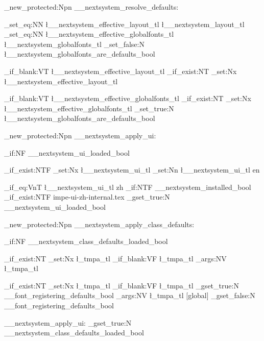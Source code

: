 \cs_new_protected:Npn \__nextsystem_resolve_defaults:
  {
    \tl_set_eq:NN \l__nextsystem_effective_layout_tl \l__nextsystem_layout_tl
    \tl_set_eq:NN \l__nextsystem_effective_globalfonts_tl \l__nextsystem_globalfonts_tl
    \bool_set_false:N \l__nextsystem_globalfonts_are_defaults_bool

    \tl_if_blank:VT \l__nextsystem_effective_layout_tl
      {
        \cs_if_exist:NT \NextDefaultLayout
          { \tl_set:Nx \l__nextsystem_effective_layout_tl { \NextDefaultLayout } }
      }

    \tl_if_blank:VT \l__nextsystem_effective_globalfonts_tl
      {
        \cs_if_exist:NT \NextDefaultGlobalFonts
          {
            \tl_set:Nx \l__nextsystem_effective_globalfonts_tl { \NextDefaultGlobalFonts }
            \bool_set_true:N \l__nextsystem_globalfonts_are_defaults_bool
          }
      }
  }

\cs_new_protected:Npn \__nextsystem_apply_ui:
  {
    \bool_if:NF \g__nextsystem_ui_loaded_bool
      {
        \cs_if_exist:NTF \NextSystemUiTag
          { \tl_set:Nx \l__nextsystem_ui_tl { \NextSystemUiTag } }
          { \tl_set:Nn \l__nextsystem_ui_tl { en } }

        \str_if_eq:VnT \l__nextsystem_ui_tl { zh }
          {
            \bool_if:NTF \g__nextsystem_installed_bool
              {  }
              {
                \cs_if_exist:NTF \NextSystemRoot
                  { \expandafter{} }
                  { {impe-ui-zh-internal.tex} }
              }
          }
        \bool_gset_true:N \g__nextsystem_ui_loaded_bool
      }
  }

\cs_new_protected:Npn \__nextsystem_apply_class_defaults:
  {
    \bool_if:NF \g__nextsystem_class_defaults_loaded_bool
      {
        \cs_if_exist:NT \NextDefaultLayout
          {
            \tl_set:Nx \l_tmpa_tl { \NextDefaultLayout }
            \tl_if_blank:VF \l_tmpa_tl
              { \exp_args:NV \UseLayout \l_tmpa_tl }
          }

        \cs_if_exist:NT \NextDefaultGlobalFonts
          {
            \tl_set:Nx \l_tmpa_tl { \NextDefaultGlobalFonts }
            \tl_if_blank:VF \l_tmpa_tl
              {
                \bool_gset_true:N \g__font_registering_defaults_bool
                \exp_args:NV \UseFonts \l_tmpa_tl [global]
                \bool_gset_false:N \g__font_registering_defaults_bool
              }
          }

        \__nextsystem_apply_ui:
        \bool_gset_true:N \g__nextsystem_class_defaults_loaded_bool
      }
  }

